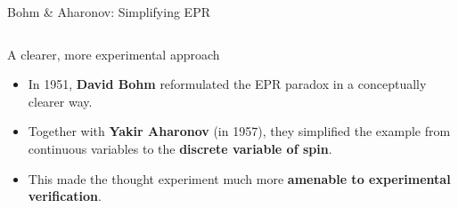 \begin{frame}{Bohm \& Aharonov: Simplifying EPR}

  \begin{columns}[T]
    \begin{column}{0.6\textwidth}
      \begin{block}{A clearer, more experimental approach}
        \begin{itemize}[<+->]
          \item In 1951, \textbf{David Bohm} reformulated the EPR paradox in a conceptually clearer way.
          \item Together with \textbf{Yakir Aharonov} (in 1957), they simplified the example from continuous variables to the \textbf{discrete variable of spin}.
          \item This made the thought experiment much more \textbf{amenable to experimental verification}.
        \end{itemize}
      \end{block}
    \end{column}


\end{columns}
\end{frame}
